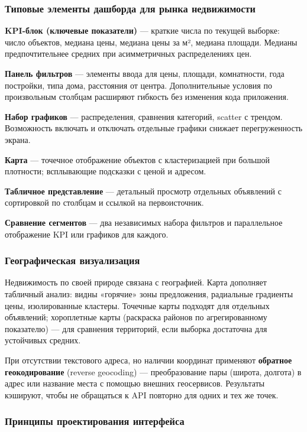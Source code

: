 \subsubsection{Типовые элементы дашборда для рынка недвижимости}

\textbf{KPI-блок (ключевые показатели)} --- краткие числа по текущей выборке: число объектов, медиана цены, медиана цены за м², медиана площади. Медианы предпочтительнее средних при асимметричных распределениях цен.

\textbf{Панель фильтров} --- элементы ввода для цены, площади, комнатности, года постройки, типа дома, расстояния от центра. Дополнительные условия по произвольным столбцам расширяют гибкость без изменения кода приложения.

\textbf{Набор графиков} --- распределения, сравнения категорий, scatter с трендом. Возможность включать и отключать отдельные графики снижает перегруженность экрана.

\textbf{Карта} --- точечное отображение объектов с кластеризацией при большой плотности; всплывающие подсказки с ценой и адресом.

\textbf{Табличное представление} --- детальный просмотр отдельных объявлений с сортировкой по столбцам и ссылкой на первоисточник.

\textbf{Сравнение сегментов} --- два независимых набора фильтров и параллельное отображение KPI или графиков для каждого.

\subsubsection{Географическая визуализация}

Недвижимость по своей природе связана с географией. Карта дополняет табличный анализ: видны «горячие» зоны предложения, радиальные градиенты цены, изолированные кластеры. Точечные карты подходят для отдельных объявлений; хороплетные карты (раскраска районов по агрегированному показателю) --- для сравнения территорий, если выборка достаточна для устойчивых средних.

При отсутствии текстового адреса, но наличии координат применяют \textbf{обратное геокодирование} (reverse geocoding) --- преобразование пары (широта, долгота) в адрес или название места с помощью внешних геосервисов. Результаты кэшируют, чтобы не обращаться к API повторно для одних и тех же точек.

\subsubsection{Принципы проектирования интерфейса}

